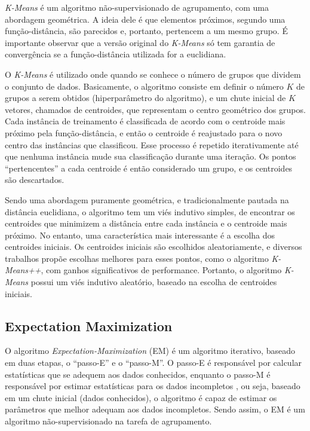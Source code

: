 \documentclass{article}
\begin{document}
{\it K-Means} é um algoritmo não-supervisionado de agrupamento, com uma abordagem geométrica.
A ideia dele é que elementos próximos, segundo uma função-distância, são parecidos e, portanto, pertencem a um mesmo grupo.
É importante observar que a versão original do {\it K-Means} só tem garantia de convergência se a função-distância utilizada for a euclidiana.

O {\it K-Means} é utilizado onde quando se conhece o número de grupos que dividem o conjunto de dados.
Basicamente, o algoritmo consiste em definir o número $K$ de grupos a serem obtidos (hiperparâmetro do algoritmo),
e um chute inicial de $K$ vetores, chamados de centroides,
que representam o centro geométrico dos grupos.
Cada instância de treinamento é classificada de acordo com o centroide mais próximo pela função-distância,
e então o centroide é reajustado para o novo centro das instâncias que classificou.
Esse processo é repetido iterativamente até que nenhuma instância mude sua classificação durante uma iteração.
Os pontos ``pertencentes'' a cada centroide é então considerado um grupo,
e os centroides são descartados.

Sendo uma abordagem puramente geométrica,
e tradicionalmente pautada na distância euclidiana,
o algoritmo tem um viés indutivo simples,
de encontrar os centroides que minimizem a distância entre cada instância e o centroide mais próximo.
No entanto, uma característica mais interessante é a escolha dos centroides iniciais.
Os centroides iniciais são escolhidos aleatoriamente,
e diversos trabalhos propõe escolhas melhores para esses pontos,
como o algoritmo {\it K-Means++}, com ganhos significativos de performance.
Portanto, o algoritmo {\it K-Means} possui um viés indutivo
aleatório, baseado na escolha de centroides iniciais.


\subsection{Expectation Maximization}

O algoritmo {\it Expectation-Maximization} (EM) é um algoritmo iterativo,
baseado em duas etapas, o ``passo-E'' e o ``passo-M''.
O passo-E é responsável por calcular estatísticas que se adequem aos dados conhecidos,
enquanto o passo-M é responsável por estimar estatísticas para os dados incompletos \cite{em-algorithm},
ou seja, baseado em um chute inicial (dados conhecidos),
o algoritmo é capaz de estimar os parâmetros que melhor adequam aos dados incompletos.
Sendo assim, o EM é um algoritmo não-supervisionado na tarefa de agrupamento.
\end{document}

